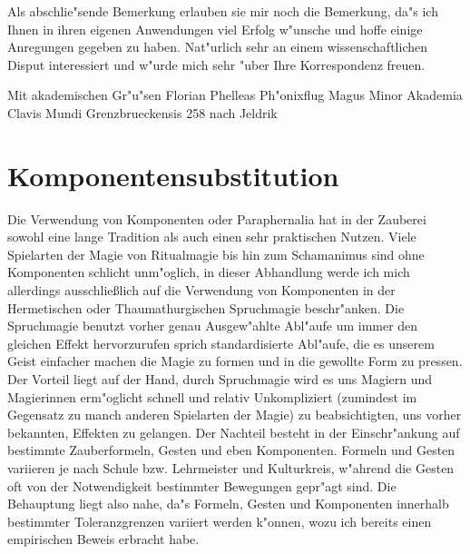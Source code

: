 \documentclass[a5paper,8pt]{book}
\begin{document}
\vspace{5mm}

Als abschlie"sende Bemerkung erlauben sie mir noch die Bemerkung, da"s ich Ihnen in ihren eigenen Anwendungen viel Erfolg w"unsche und hoffe einige Anregungen gegeben 
zu haben. Nat"urlich sehr an einem wissenschaftlichen Disput interessiert und w"urde mich sehr "uber Ihre Korrespondenz freuen.

\vspace{10mm}

Mit akademischen Gr"u"sen
Florian Phelleas Ph"onixflug
Magus Minor Akademia Clavis Mundi Grenzbrueckensis 258 nach Jeldrik

\newpage

\section{Komponentensubstitution}

Die Verwendung von Komponenten oder Paraphernalia hat in der Zauberei sowohl eine lange Tradition als auch einen sehr praktischen Nutzen. Viele Spielarten der Magie 
von Ritualmagie bis hin zum Schamanimus sind ohne Komponenten schlicht unm"oglich, in dieser Abhandlung werde ich mich allerdings ausschließlich auf die Verwendung 
von Komponenten in der Hermetischen oder Thaumathurgischen Spruchmagie beschr"anken.
Die Spruchmagie benutzt vorher genau Ausgew"ahlte Abl"aufe um immer den gleichen Effekt hervorzurufen sprich standardisierte Abl"aufe, die es unserem Geist einfacher 
machen die Magie zu formen und in die gewollte Form zu pressen. Der Vorteil liegt auf der Hand, durch Spruchmagie wird es uns Magiern und Magierinnen erm"oglicht 
schnell und relativ Unkompliziert (zumindest im Gegensatz zu manch anderen Spielarten der Magie) zu beabsichtigten, uns vorher bekannten, Effekten zu gelangen. Der 
Nachteil besteht in der Einschr"ankung auf bestimmte Zauberformeln, Gesten und eben Komponenten. Formeln und Gesten variieren je nach Schule bzw. Lehrmeister und 
Kulturkreis, w"ahrend die Gesten oft von der Notwendigkeit bestimmter Bewegungen gepr"agt sind. Die Behauptung liegt also nahe, da"s Formeln, Gesten und Komponenten 
innerhalb bestimmter Toleranzgrenzen variiert werden k"onnen, wozu ich bereits einen empirischen Beweis erbracht habe.\\
\end{document}
